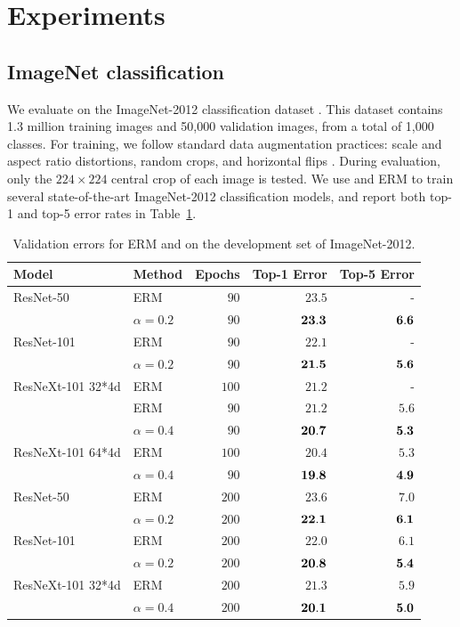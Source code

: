 \section{Experiments}

\subsection{ImageNet classification}
\label{sec:imagenet}
We evaluate \mixup{} on the ImageNet-2012 classification dataset
\citep{ILSVRC15}. This dataset contains 1.3 million training images and 50,000
validation images, from a total of 1,000 classes. For training, we follow
standard data augmentation practices: scale and aspect ratio distortions,
random crops, and horizontal flips \citep{goyal2017accurate}. During
evaluation, only the $224\times 224$ central crop of each image is tested. We
use \mixup{} and ERM to train several state-of-the-art ImageNet-2012
classification models, and report both top-1 and top-5 error rates in
Table~\ref{table:imagenet_result}.

\begin{table}
	\centering
	\begin{tabular}[b]{ ll rrr }
		\toprule
		{Model} & {Method} & {Epochs} & {Top-1 Error} &  {Top-5 Error} \\
        \midrule
		{ResNet-50} & ERM \citep{goyal2017accurate} & $90$ & $23.5$ & {-} \\
		& \mixup{} $\alpha=0.2$ & $90$ & {$\bf 23.3$} &  {$\bf 6.6$}\\
		\cmidrule(lr){2-2}
		{ResNet-101} & ERM \citep{goyal2017accurate} & $90$ & $22.1$ & {-} \\
		& \mixup{} $\alpha=0.2$ & $90$ & {$\bf 21.5$} &  {$\bf 5.6$}\\
		\cmidrule(lr){2-2}
		{ResNeXt-101 32*4d} & ERM \citep{xie2016aggregated} & $100$ & $21.2$ & {-} \\
		& ERM & $90$ & $21.2$ & $5.6$ \\
		& \mixup{} $\alpha=0.4$ & $90$ & {$\bf 20.7$} &  {$\bf 5.3$}\\
		\cmidrule(lr){2-2}
        ResNeXt-101 64*4d  & ERM \citep{xie2016aggregated} & $100$ & $20.4$ & $5.3 $ \\
        & \mixup{} $\alpha=0.4$ & $90$ & {$\bf 19.8$} & {$\bf 4.9 $} \\
		\midrule
		{ResNet-50} & ERM & $200$ & $23.6$ & $7.0$ \\
		& \mixup{} $\alpha=0.2$ & $200$ & {$\bf 22.1$} &  {$\bf 6.1$}\\
		\cmidrule(lr){2-2}
		{ResNet-101} & ERM & $200$ & $22.0$ & $6.1$ \\
		 & \mixup{} $\alpha=0.2$ & $200$ & {$\bf 20.8$} &  {$\bf 5.4$}\\
		 \cmidrule(lr){2-2}
		{ResNeXt-101 32*4d}  & ERM & $200$ & $21.3$ & $5.9$ \\
		& \mixup{} $\alpha=0.4$ & $200$ & $\bf 20.1$ &  $\bf 5.0$\\
        \bottomrule
	\end{tabular}
    \caption{Validation errors for ERM and \mixup{} on the development set of
    ImageNet-2012.}
    \label{table:imagenet_result}
\end{table}

